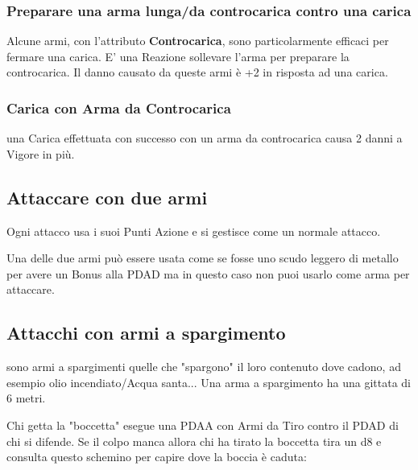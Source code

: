 \documentclass[12pt,a4paper,twoside,openany]{book}
\begin{document}
\begin{multicols}{2}
\subsubsection{Preparare una arma lunga/da controcarica contro una carica} \label{prepararearmalungacontrocarica}

Alcune armi, con l'attributo \textbf{Controcarica}, sono particolarmente efficaci per fermare una carica. E' una Reazione sollevare l'arma per preparare la controcarica. Il danno causato da queste armi è +2 in risposta ad una carica.

\subsubsection{Carica con Arma da Controcarica} \label{caricaarmadacontrocarica}

una Carica effettuata con successo con un arma da controcarica causa 2 danni a Vigore in più.

\subsection{Attaccare con due armi}

Ogni attacco usa i suoi Punti Azione e si gestisce come un normale attacco.

Una delle due armi può essere usata come se fosse uno scudo leggero di metallo per avere un Bonus alla PDAD ma in questo caso non puoi usarlo come arma per attaccare.

\subsection{Attacchi con armi a spargimento} \label{attacchiarmidaspargimento}\hypertarget{spargimento}{}

sono armi a spargimenti quelle che "spargono" il loro contenuto dove cadono, ad esempio olio incendiato/Acqua santa... Una arma a spargimento ha una gittata di 6 metri.

Chi getta la "boccetta" esegue una PDAA con Armi da Tiro contro il PDAD di chi si difende.
Se il colpo manca allora chi ha tirato la boccetta tira un d8 e consulta questo schemino per capire dove la boccia è caduta:

\medskip


\end{multicols}
\end{document}
